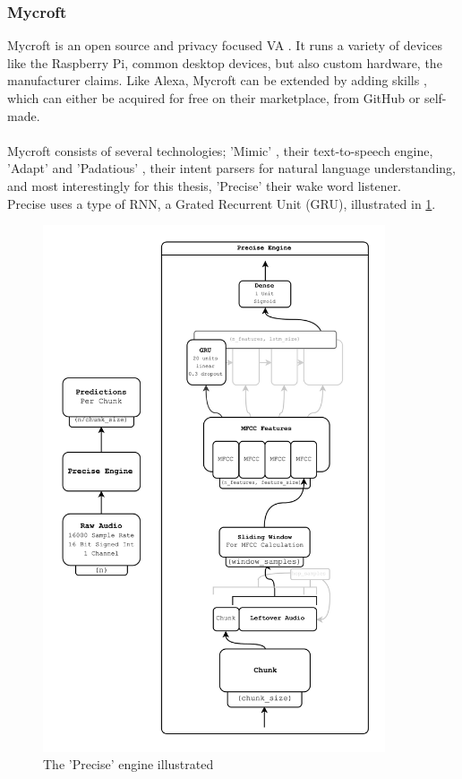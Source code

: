 \subsubsection{Mycroft}

Mycroft is an open source \cite{mycroft_gh} and privacy focused VA \cite{mycroft}.
It runs a variety of devices like the Raspberry Pi, common desktop devices, but also custom hardware, the manufacturer claims.
Like Alexa, Mycroft can be extended by adding skills \cite{mycroft_skills}, which can either be acquired for free on their marketplace,
from GitHub or self-made.\\\\
Mycroft consists of several technologies; 'Mimic' \cite{mycroft_mimic3}, their text-to-speech engine, 'Adapt' \cite{mycroft_adapt} and 'Padatious' \cite{mycroft_padatious},
their intent parsers for natural language understanding, and most interestingly for this thesis, 'Precise' \cite{mycroft_precise} their wake word listener.\\
Precise uses a type of RNN, a Grated Recurrent Unit (GRU), illustrated in \ref{fig:precise_gru}.


\begin{figure}[htb]
    \centering
    \includegraphics[width=0.9\textwidth]{figures/precise_engine.PNG}
    \caption[Illustration: The 'Precise' engine \cite{mycroft_precise}]{The 'Precise' engine illustrated}
    \label{fig:precise_gru}
\end{figure}



